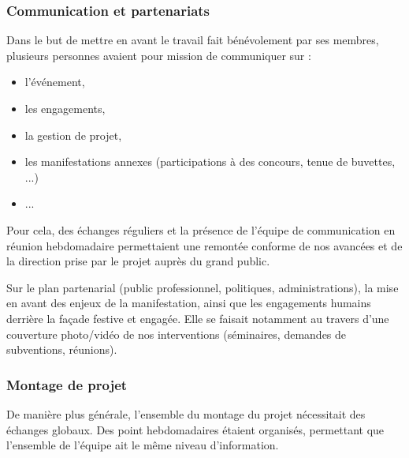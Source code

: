 \documentclass[12pt,a4paper]{report}
\begin{document}
\subsubsection{Communication et partenariats}
Dans le but de mettre en avant le travail fait bénévolement par ses membres, plusieurs personnes avaient pour mission de communiquer sur :
\begin{itemize}
\item l'événement,
\item les engagements,
\item la gestion de projet,
\item les manifestations annexes (participations à des concours, tenue de buvettes, ...)
\item ...
\end{itemize}

Pour cela, des échanges réguliers et la présence de l'équipe de communication en réunion hebdomadaire permettaient une remontée conforme de nos avancées et de la direction prise par le projet auprès du grand public.

Sur le plan partenarial (public professionnel, politiques, administrations), la mise en avant des enjeux de la manifestation, ainsi que les engagements humains derrière la façade festive et engagée. Elle se faisait notamment au travers d'une couverture photo/vidéo de nos interventions (séminaires, demandes de subventions, réunions).


\subsubsection{Montage de projet}
De manière plus générale, l'ensemble du montage du projet nécessitait des échanges globaux. Des point hebdomadaires étaient organisés, permettant que l'ensemble de l'équipe ait le même niveau d'information.
\end{document}
